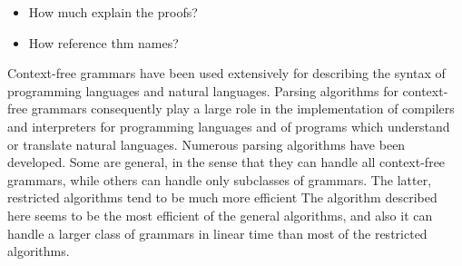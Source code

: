 %
\begin{isabellebody}%
%
%
\isadelimtheory
%
\endisadelimtheory
%
\isatagtheory
%
\endisatagtheory
{\isafoldtheory}%
%
\isadelimtheory
%
\endisadelimtheory
%
\isadelimdocument
%
\endisadelimdocument
%
\isatagdocument
%
\isamarkuptrue%
%
\endisatagdocument
{\isafolddocument}%
%
\isadelimdocument
%
\endisadelimdocument
%
\begin{isamarkuptext}%
\begin{itemize}
    \item How much explain the proofs? \\
    \item How reference thm names? \\
  \end{itemize}%
\end{isamarkuptext}\isamarkuptrue%
%
\isadelimdocument
%
\endisadelimdocument
%
\isatagdocument
%
\isamarkuptrue%
%
\isamarkuptrue%
%
\endisatagdocument
{\isafolddocument}%
%
\isadelimdocument
%
\endisadelimdocument
%
\begin{isamarkuptext}%
Context-free grammars have been used extensively for describing the syntax of programming languages
and natural languages. Parsing algorithms for context-free grammars consequently play a large role in
the implementation of compilers and interpreters for programming languages and of programs which understand
or translate natural languages. Numerous parsing algorithms have been developed. Some are general,
in the sense that they can handle all context-free grammars, while others can handle only subclasses of
grammars. The latter, restricted algorithms tend to be much more efficient The algorithm described here
seems to be the most efficient of the general algorithms, and also it can handle a larger class of grammars
in linear time than most of the restricted algorithms.


\end{isamarkuptext}
\end{isabellebody}
